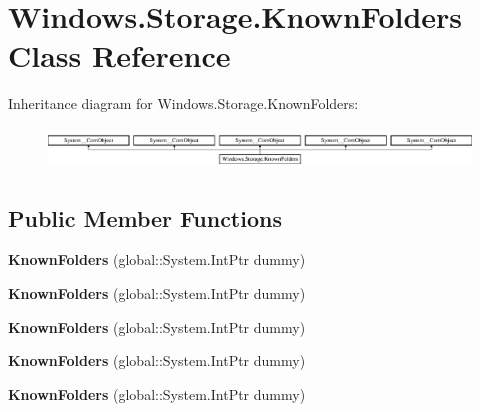 \hypertarget{class_windows_1_1_storage_1_1_known_folders}{}\section{Windows.\+Storage.\+Known\+Folders Class Reference}
\label{class_windows_1_1_storage_1_1_known_folders}
Inheritance diagram for Windows.\+Storage.\+Known\+Folders\+:\begin{figure}[H]
\begin{center}
\leavevmode
\includegraphics[height=1.103448cm]{class_windows_1_1_storage_1_1_known_folders}
\end{center}
\end{figure}
\subsection*{Public Member Functions}
\begin{DoxyCompactItemize}
\item 
\mbox{\label{class_windows_1_1_storage_1_1_known_folders_a46a9409a85b5daa46115453707035d8e}} 
{\bfseries Known\+Folders} (global\+::\+System.\+Int\+Ptr dummy)
\item 
\mbox{\label{class_windows_1_1_storage_1_1_known_folders_a46a9409a85b5daa46115453707035d8e}} 
{\bfseries Known\+Folders} (global\+::\+System.\+Int\+Ptr dummy)
\item 
\mbox{\label{class_windows_1_1_storage_1_1_known_folders_a46a9409a85b5daa46115453707035d8e}} 
{\bfseries Known\+Folders} (global\+::\+System.\+Int\+Ptr dummy)
\item 
\mbox{\label{class_windows_1_1_storage_1_1_known_folders_a46a9409a85b5daa46115453707035d8e}} 
{\bfseries Known\+Folders} (global\+::\+System.\+Int\+Ptr dummy)
\item 
\mbox{\label{class_windows_1_1_storage_1_1_known_folders_a46a9409a85b5daa46115453707035d8e}} 
{\bfseries Known\+Folders} (global\+::\+System.\+Int\+Ptr dummy)
\end{DoxyCompactItemize}

